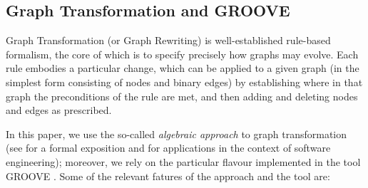 
\subsection{Graph Transformation and GROOVE}\label{sec:GTS}

Graph Transformation (or Graph Rewriting) is well-established rule-based formalism, the core of which is to specify precisely how graphs may evolve. Each rule embodies a particular change, which can be applied to a given graph (in the simplest form consisting of nodes and binary edges) by establishing where in that graph the preconditions of the rule are met, and then adding and deleting nodes and edges as prescribed.

In this paper, we use the so-called \emph{algebraic approach} to graph transformation (see \cite{DBLP:series/eatcs/EhrigEPT06} for a formal exposition and \cite{DBLP:books/sp/HeckelT20} for applications in the context of software engineering); moreover, we rely on the particular flavour implemented in the tool GROOVE \cite{DBLP:journals/sttt/GhamarianMRZZ12,GROOVE}. Some of the relevant fatures of the approach and the tool are:
%

